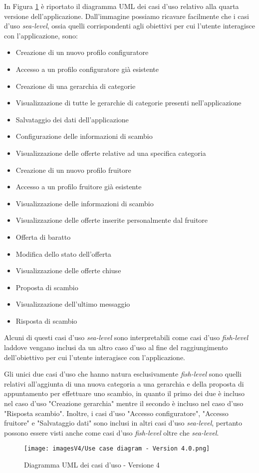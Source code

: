 In Figura \ref{fig:Use Case 4} è riportato il diagramma UML dei casi d'uso relativo alla quarta versione dell'applicazione. Dall'immagine possiamo ricavare facilmente che i casi d'uso \textit{sea-level}, ossia quelli corrispondenti agli obiettivi per cui l'utente interagisce con l'applicazione, sono:
\begin{itemize}
    \item Creazione di un nuovo profilo configuratore 
    \item Accesso a un profilo configuratore già esistente
    \item Creazione di una gerarchia di categorie
    \item Visualizzazione di tutte le gerarchie di categorie presenti nell'applicazione
    \item Salvataggio dei dati dell'applicazione
    \item Configurazione delle informazioni di scambio
    \item Visualizzazione delle offerte relative ad una specifica categoria
    \item Creazione di un nuovo profilo fruitore
    \item Accesso a un profilo fruitore già esistente
    \item Visualizzazione delle informazioni di scambio
    \item Visualizzazione delle offerte inserite personalmente dal fruitore
    \item Offerta di baratto
    \item Modifica dello stato dell'offerta  
    \item Visualizzazione delle offerte chiuse
    \item Proposta di scambio
    \item Visualizzazione dell'ultimo messaggio
    \item Risposta di scambio
\end{itemize}
Alcuni di questi casi d'uso \textit{sea-level} sono interpretabili come casi d'uso \textit{fish-level} laddove vengano inclusi da un altro caso d'uso al fine del raggiungimento dell'obiettivo per cui l'utente interagisce con l'applicazione.

Gli unici due casi d'uso che hanno natura esclusivamente \textit{fish-level} sono quelli relativi all'aggiunta di una nuova categoria a una gerarchia e della proposta di appuntamento per effettuare uno scambio, in quanto il primo dei due è incluso nel caso d'uso "Creazione gerarchia" mentre il secondo è incluso nel caso d'uso "Risposta scambio". Inoltre, i casi d'uso "Accesso configuratore", "Accesso fruitore" e "Salvataggio dati" sono inclusi in altri casi d'uso \textit{sea-level}, pertanto possono essere visti anche come casi d'uso \textit{fish-level} oltre che \textit{sea-level}.

\begin{figure}[ht]
\centering
\texttt{[image: imagesV4/Use case diagram - Version 4.0.png]}
\caption{\label{fig:Use Case 4}Diagramma UML dei casi d'uso - Versione 4}
\end{figure}\bigskip

